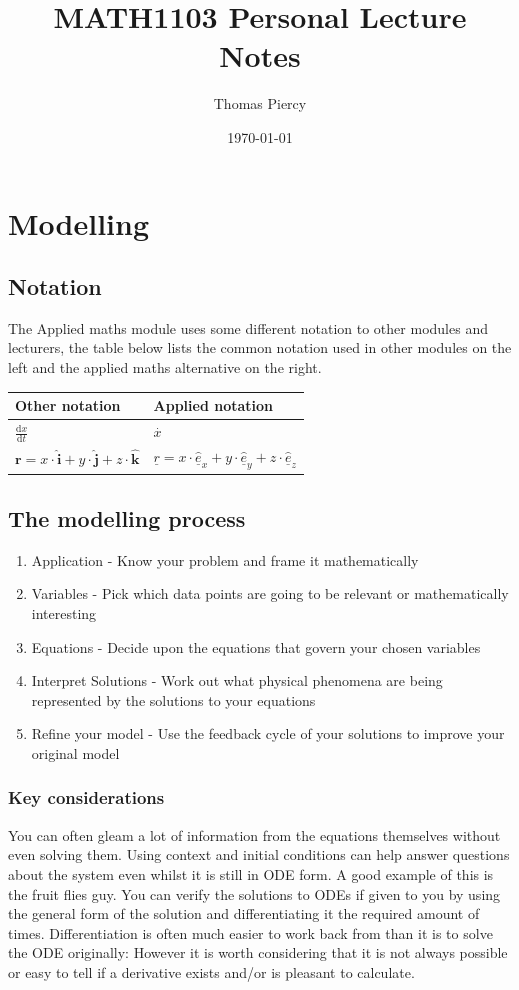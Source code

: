 \documentclass[12pt]{article}
\title{\textbf{MATH1103 Personal Lecture Notes}}
\author{Thomas Piercy}
\date{\today{}}
\newcommand{\uvec}[1]{\underline{\hat{#1}}}
\newcommand{\bvec}[1]{\uvec{e}_#1}
\begin{document}
\maketitle
\hrulefill
{}
\tableofcontents
\newpage
\section{Modelling}
\subsection*{Notation}
The Applied maths module uses some different notation to other modules and lecturers, the table below lists the common notation used in other modules on the left and the applied maths alternative on the right.
\begin{table}[H]
    \begin{tabular}{|l|l|}
        \hline
        \textbf{Other notation} & \textbf{Applied notation}  \\ \hline
        \(\frac{\text{d}x}{\text{d}t}\) & \(\overset{.}{x}\) \\ \hline
        \(\textbf{r}=x\cdot\hat{\textbf{i}}+y\cdot\hat{\textbf{j}}+z\cdot\hat{\textbf{k}}\) & \(\underline{r}=x\cdot\bvec{x}+y\cdot\bvec{y}+z\cdot\bvec{z}\) \\ \hline
    \end{tabular}
\end{table}
\subsection*{The modelling process}
\begin{enumerate}
    \item Application - Know your problem and frame it mathematically
    \item Variables - Pick which data points are going to be relevant or mathematically interesting
    \item Equations - Decide upon the equations that govern your chosen variables
    \item Interpret Solutions - Work out what physical phenomena are being represented by the solutions to your equations
    \item Refine your model - Use the feedback cycle of your solutions to improve your original model
\end{enumerate}
\subsubsection*{Key considerations}
You can often gleam a lot of information from the equations themselves without even solving them. Using context and initial conditions can help answer questions about the system even whilst it is still in ODE form. A good example of this is the fruit flies guy. You can verify the solutions to ODEs if given to you by using the general form of the solution and differentiating it the required amount of times. Differentiation is often much easier to work back from than it is to solve the ODE originally: However it is worth considering that it is not always possible or easy to tell if a derivative exists and/or is pleasant to calculate.
\end{document}
